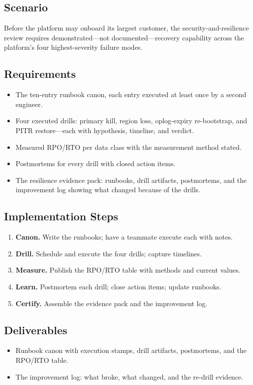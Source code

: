 \subsection*{Scenario}
Before the platform may onboard its largest customer, the security-and-resilience review requires demonstrated---not documented---recovery capability across the platform's four highest-severity failure modes.

\subsection*{Requirements}
\begin{itemize}
    \item The ten-entry runbook canon, each entry executed at least once by a second engineer.
    \item Four executed drills: primary kill, region loss, oplog-expiry re-bootstrap, and PITR restore---each with hypothesis, timeline, and verdict.
    \item Measured RPO/RTO per data class with the measurement method stated.
    \item Postmortems for every drill with closed action items.
    \item The resilience evidence pack: runbooks, drill artifacts, postmortems, and the improvement log showing what changed because of the drills.
\end{itemize}

\subsection*{Implementation Steps}
\begin{enumerate}
    \item \textbf{Canon.} Write the runbooks; have a teammate execute each with notes.
    \item \textbf{Drill.} Schedule and execute the four drills; capture timelines.
    \item \textbf{Measure.} Publish the RPO/RTO table with methods and current values.
    \item \textbf{Learn.} Postmortem each drill; close action items; update runbooks.
    \item \textbf{Certify.} Assemble the evidence pack and the improvement log.
\end{enumerate}

\subsection*{Deliverables}
\begin{itemize}
    \item Runbook canon with execution stamps, drill artifacts, postmortems, and the RPO/RTO table.
    \item The improvement log: what broke, what changed, and the re-drill evidence.
\end{itemize}

